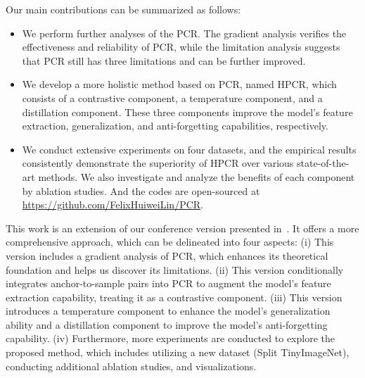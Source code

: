 Our main contributions can be summarized as follows:
\begin{itemize}
\item[1)] We perform further analyses of the PCR. The gradient analysis verifies the effectiveness and reliability of PCR, while the limitation analysis suggests that PCR still has three limitations and can be further improved.

\item[2)] We develop a more holistic method based on PCR, named HPCR, which consists of a contrastive component, a temperature component, and a distillation component. These three components improve the model's feature extraction, generalization, and anti-forgetting capabilities, respectively.

\item[3)] We conduct extensive experiments on four datasets, and the empirical results consistently demonstrate the superiority of HPCR over various state-of-the-art methods. We also investigate and analyze the benefits of each component by ablation studies. And the codes are open-sourced at \url{https://github.com/FelixHuiweiLin/PCR}.
\end{itemize}

This work is an extension of our conference version presented in~\cite{Lin_2023_CVPR}. It offers a more comprehensive approach, which can be delineated into four aspects: (i) This version includes a gradient analysis of PCR, which enhances its theoretical foundation and helps us discover its limitations. (ii) This version conditionally integrates anchor-to-sample pairs into PCR to augment the model's feature extraction capability, treating it as a contrastive component. (iii) This version introduces a temperature component to enhance the model's generalization ability and a distillation component to improve the model's anti-forgetting capability. (iv) Furthermore, more experiments are conducted to explore the proposed method, which includes utilizing a new dataset (Split TinyImageNet), conducting additional ablation studies, and visualizations.